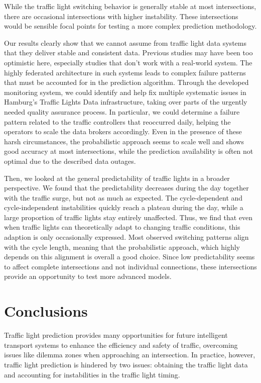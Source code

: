 While the traffic light switching behavior is generally stable at most intersections, there are occasional intersections with higher instability. These intersections would be sensible focal points for testing a more complex prediction methodology.

\begin{Summary}
Our results clearly show that we cannot assume from traffic light data systems that they deliver stable and consistent data. Previous studies may have been too optimistic here, especially studies that don’t work with a real-world system. The highly federated architecture in such systems leads to complex failure patterns that must be accounted for in the prediction algorithm. Through the developed monitoring system, we could identify and help fix multiple systematic issues in Hamburg’s Traffic Lights Data infrastructure, taking over parts of the urgently needed quality assurance process. In particular, we could determine a failure pattern related to the traffic controllers that reoccurred daily, helping the operators to scale the data brokers accordingly. Even in the presence of these harsh circumstances, the probabilistic approach seems to scale well and shows good accuracy at most intersections, while the prediction availability is often not optimal due to the described data outages.

Then, we looked at the general predictability of traffic lights in a broader perspective. We found that the predictability decreases during the day together with the traffic surge, but not as much as expected. The cycle-dependent and cycle-independent instabilities quickly reach a plateau during the day, while a large proportion of traffic lights stay entirely unaffected. Thus, we find that even when traffic lights can theoretically adapt to changing traffic conditions, this adaption is only occasionally expressed. Most observed switching patterns align with the cycle length, meaning that the probabilistic approach, which highly depends on this alignment is overall a good choice. Since low predictability seems to affect complete intersections and not individual connections, these intersections provide an opportunity to test more advanced models.
\end{Summary}

\section{Conclusions}

Traffic light prediction provides many opportunities for future intelligent transport systems to enhance the efficiency and safety of traffic, overcoming issues like dilemma zones when approaching an intersection. In practice, however, traffic light prediction is hindered by two issues: obtaining the traffic light data and accounting for instabilities in the traffic light timing. 

